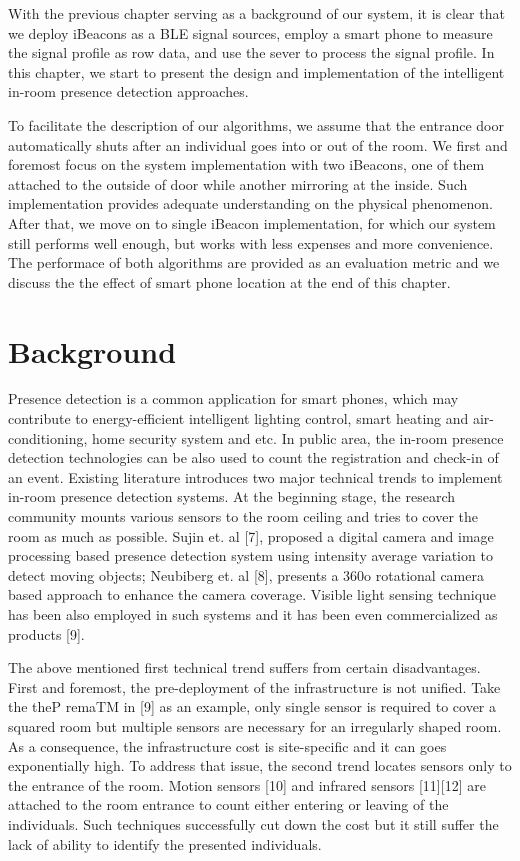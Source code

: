 \documentclass[12pt]{report}
\begin{document}
With the previous chapter serving as a background of our system, it is clear that we deploy iBeacons as a BLE signal sources, employ a smart phone to measure the signal profile as row data, and use the sever to process the signal profile. In this chapter, we start to present the design and implementation of the intelligent in-room presence detection approaches. 

To facilitate the description of our algorithms, we assume that the entrance door automatically shuts after an individual goes into or out of the room. We first and foremost focus on the system implementation with two iBeacons, one of them attached to the outside of door while another mirroring at the inside. Such implementation provides adequate understanding on the physical phenomenon. After that, we move on to single iBeacon implementation, for which our system still performs well enough, but works with less expenses and more convenience. The performace of both algorithms are provided as an evaluation metric and we discuss the the effect of smart phone location at the end of this chapter.

\section{Background}
Presence detection is a common application for smart phones, which may contribute to energy-efficient intelligent lighting control, smart heating and air-conditioning, home security system and etc. In public area, the in-room presence detection technologies can be also used to count the registration and check-in of an event. Existing literature introduces two major technical trends to implement in-room presence detection systems. At the beginning stage, the research community mounts various sensors to the room ceiling and tries to cover the room as much as possible. Sujin et. al [7], proposed a digital camera and image processing based presence detection system using intensity average variation to detect moving objects; Neubiberg et. al [8], presents a 360o rotational camera based approach to enhance the camera coverage. Visible light sensing technique has been also employed in such systems and it has been even commercialized as products [9]. 

The above mentioned first technical trend suffers from certain disadvantages. First and foremost, the pre-deployment of the infrastructure is not unified. Take the theP remaTM in [9] as an example, only single sensor is required to cover a squared room but multiple sensors are necessary for an irregularly shaped room. As a consequence, the infrastructure cost is site-specific and it can goes exponentially high. To address that issue, the second trend locates sensors only to the entrance of the room. Motion sensors [10] and infrared sensors [11][12] are attached to the room entrance to count either entering or leaving of the individuals. Such techniques successfully cut down the cost but it still suffer the lack of ability to identify the presented individuals. 
\end{document}
